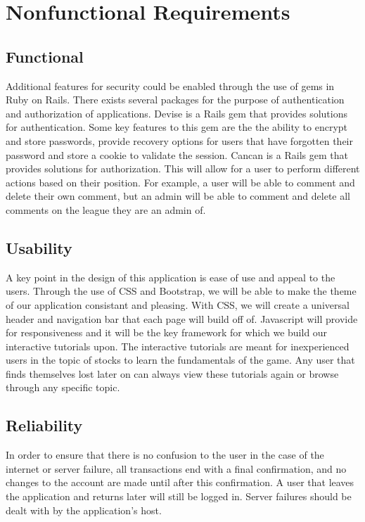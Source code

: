 \chapter{Nonfunctional Requirements}

\section{Functional}
Additional features for security could be enabled through the use of gems in Ruby on Rails. There exists several packages for the purpose of authentication and authorization of applications. 
Devise is a Rails gem that provides solutions for authentication. Some key features to this gem are the the ability to encrypt and store passwords, provide recovery options for users that have forgotten their password and store a cookie to validate the session. 
Cancan is a Rails gem that provides solutions for authorization. This will allow for a user to perform different actions based on their position. For example, a user will be able to comment and delete their own comment, but an admin will be able to comment and delete all comments on the league they are an admin of.


\section{Usability}
A key point in the design of this application is ease of use and appeal to the users. Through the use of CSS and Bootstrap, we will be able to make the theme of our application consistant and pleasing. With CSS, we will create a universal header and navigation bar that each page will build off of. Javascript will provide for responsiveness and it will be the key framework for which we build our interactive tutorials upon. The interactive tutorials are meant for inexperienced users in the topic of stocks to learn the fundamentals of the game. Any user that finds themselves lost later on can always view these tutorials again or browse through any specific topic.


\section{Reliability}
In order to ensure that there is no confusion to the user in the case of the internet or server failure, all transactions end with a final confirmation, and no changes to the account are made until after this confirmation. A user that leaves the application and returns later will still be logged in. Server failures should be dealt with by the application's host.


